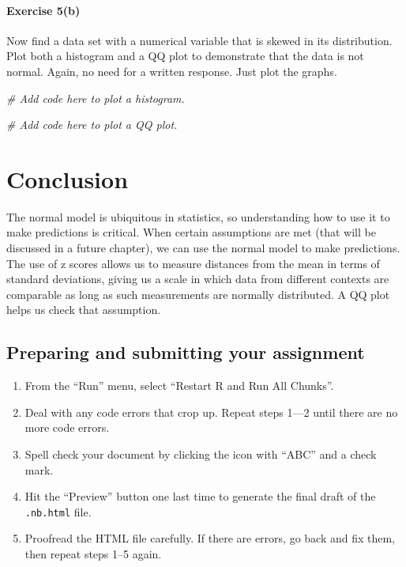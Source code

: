 \documentclass[
]{book}
\newenvironment{Shaded}{\begin{snugshade}}{\end{snugshade}}
\newcommand{\CommentTok}[1]{\textcolor[rgb]{0.56,0.35,0.01}{\textit{#1}}}
\providecommand{\tightlist}{%
  \setlength{\itemsep}{0pt}\setlength{\parskip}{0pt}}
\begin{document}
\hypertarget{exercise-5b-1}{%
\paragraph*{Exercise 5(b)}\label{exercise-5b-1}}

Now find a data set with a numerical variable that is skewed in its distribution. Plot both a histogram and a QQ plot to demonstrate that the data is not normal. Again, no need for a written response. Just plot the graphs.

\begin{Shaded}
\begin{Highlighting}[]
\CommentTok{\# Add code here to plot a histogram.}
\end{Highlighting}
\end{Shaded}

\begin{Shaded}
\begin{Highlighting}[]
\CommentTok{\# Add code here to plot a QQ plot.}
\end{Highlighting}
\end{Shaded}

\hypertarget{normal-conclusion}{%
\section{Conclusion}\label{normal-conclusion}}

The normal model is ubiquitous in statistics, so understanding how to use it to make predictions is critical. When certain assumptions are met (that will be discussed in a future chapter), we can use the normal model to make predictions. The use of z scores allows us to measure distances from the mean in terms of standard deviations, giving us a scale in which data from different contexts are comparable as long as such measurements are normally distributed. A QQ plot helps us check that assumption.

\hypertarget{normal-prep}{%
\subsection{Preparing and submitting your assignment}\label{normal-prep}}

\begin{enumerate}
\def\labelenumi{\arabic{enumi}.}
\tightlist
\item
  From the ``Run'' menu, select ``Restart R and Run All Chunks''.
\item
  Deal with any code errors that crop up. Repeat steps 1---2 until there are no more code errors.
\item
  Spell check your document by clicking the icon with ``ABC'' and a check mark.
\item
  Hit the ``Preview'' button one last time to generate the final draft of the \texttt{.nb.html} file.
\item
  Proofread the HTML file carefully. If there are errors, go back and fix them, then repeat steps 1--5 again.
\end{enumerate}
\end{document}
